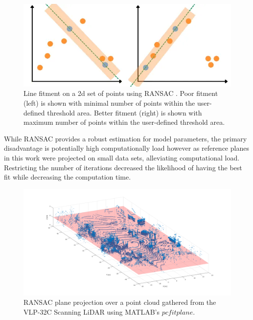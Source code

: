 \documentclass[numbered,pdftex]{ohio-etd}
\begin{document}
{{		\begin{figure}[H]
			\centering
			\includegraphics[width=0.7\linewidth]{Defense_Images/RANSAC_good_and_bad.png}
			\caption[2D Simplified RANSAC Example]{Line fitment on a 2d set of points using RANSAC \cite{alam_using_2022}. Poor fitment (left) is shown with minimal number of points within the user-defined threshold area. Better fitment (right) is shown with maximum number of points within the user-defined threshold area.}
			\label{fig:Ransac_2D_Example}
		\end{figure}

		{While RANSAC provides a robust estimation for model parameters, the primary disadvantage is potentially high computationally load \cite{yaniv_random_2010} however as reference planes in this work were projected on small data sets, alleviating computational load. Restricting the number of iterations decreased the likelihood of having the best fit while decreasing the computation time.}
	
		
		\begin{figure}[H]
			\centering
			\includegraphics[width=0.7\linewidth]{Defense_Images/RANSAC_example_proj.png}
			\caption[RANSAC Plane Projection Example]{RANSAC plane projection over a point cloud gathered from the VLP-32C Scanning LiDAR using MATLAB's $pcfitplane$.}
			\label{fig:RANSAC_example_proj}
		\end{figure}
		
	} %
	
}
\end{document}
